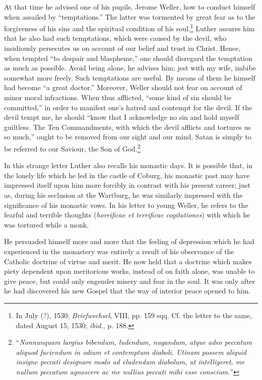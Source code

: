 At that time he advised one of his pupils, Jerome Weller, how to conduct
himself when assailed by “temptations.” The latter was tormented by great
fear as to the forgiveness of his sins and the spiritual condition of his soul.\footnote
{In July (?), 1530; \textit{Briefwechsel}, VIII, pp. 159 sqq. Cf. the letter to the same, dated
August 15, 1530; \textit{ibid.}, p. 188.}
Luther assures him that he also had such temptations, which were caused by
the devil, who insidiously persecutes us on account of our belief and trust in
Christ. Hence, when tempted “to despair and blaspheme,” one should disregard
the temptation as much as possible. Avoid being alone, he advises him;
jest with my wife, imbibe somewhat more freely. Such temptations are useful.
By means of them he himself had become “a great doctor.” Moreover,
Weller should not fear on account of minor moral infractions. When thus
afflicted, “some kind of sin should be committed,” in order to manifest one’s
hatred and contempt for the devil. If the devil tempt me, he should “know
that I acknowledge no sin and hold myself guiltless. The Ten Commandments,
with which the devil afflicts and tortures us so much,” ought to be
removed from our sight and our mind. Satan is simply to be referred to our
Saviour, the Son of God.\footnote
{“\textit{Nonnunquam largius bibendum, ludendum, nugandum, atque adeo peccatum aliquod
faciendum in odium et contemptum diaboli. Utinam possem aliquid insigne peccati designare
modo ad eludendum diabolum, ut intelligeret, me nullum peccatum agnoscere ac me
nullius peccati mihi esse conscium.}”}

In this strange letter Luther also recalls his monastic days. It is possible
that, in the lonely life which he led in the castle of Coburg, his monastic
past may have impressed itself upon him more forcibly in contrast with his
present career; just as, during his seclusion at the Wartburg, he was similarly
impressed with the significance of his monastic vows. In his letter to young
Weller, he refers to the fearful and terrible thoughts (\textit{horrificae et terrificae
cogitationes}) with which he was tortured while a monk.

He persuaded himself more and more that the feeling of depression
which he had experienced in the monastery was entirely a result of
his observance of the Catholic doctrine of virtue and merit. He now
held that a doctrine which makes piety dependent upon meritorious
works, instead of on faith alone, was unable to give peace, but could
only engender misery and fear in the soul. It was only after he had
discovered his new Gospel that the way of interior peace opened to
him.

